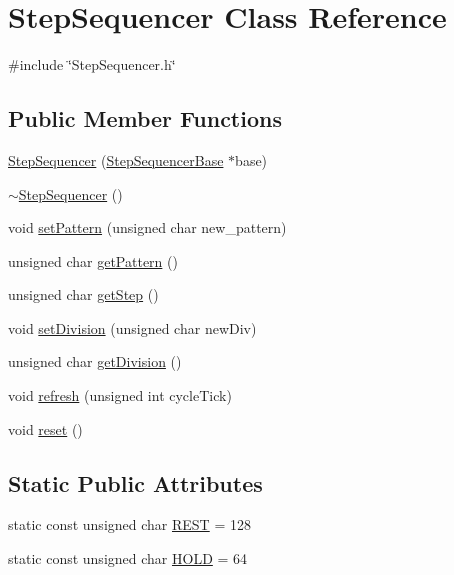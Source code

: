\hypertarget{class_step_sequencer}{}\section{Step\+Sequencer Class Reference}
\label{class_step_sequencer}


{\ttfamily \#include \char`\"{}Step\+Sequencer.\+h\char`\"{}}

\subsection*{Public Member Functions}
\begin{DoxyCompactItemize}
\item 
\hyperlink{class_step_sequencer_a552647854b6f7c5d653432774c357f3e}{Step\+Sequencer} (\hyperlink{class_step_sequencer_base}{Step\+Sequencer\+Base} $\ast$base)
\item 
\hyperlink{class_step_sequencer_a82bc995a1e19baecda84708de8fa265f}{$\sim$\+Step\+Sequencer} ()
\item 
void \hyperlink{class_step_sequencer_ac611afad54d4336977925b7f3495e8b4}{set\+Pattern} (unsigned char new\+\_\+pattern)
\item 
unsigned char \hyperlink{class_step_sequencer_a6c3987d5f4a966e8fcde3f7926aca54e}{get\+Pattern} ()
\item 
unsigned char \hyperlink{class_step_sequencer_ad00472eb91462892049d5e4757e29af3}{get\+Step} ()
\item 
void \hyperlink{class_step_sequencer_a5d62b641961ca9eaef9273efb9ed38b0}{set\+Division} (unsigned char new\+Div)
\item 
unsigned char \hyperlink{class_step_sequencer_a06c5c7b852aee258ad8b245058cee6ad}{get\+Division} ()
\item 
void \hyperlink{class_step_sequencer_a706e6a91c6b3ccd606876f57c334b311}{refresh} (unsigned int cycle\+Tick)
\item 
void \hyperlink{class_step_sequencer_afc3d99a316fa16322c1a582a49e8f272}{reset} ()
\end{DoxyCompactItemize}
\subsection*{Static Public Attributes}
\begin{DoxyCompactItemize}
\item 
static const unsigned char \hyperlink{class_step_sequencer_a2bba012830137ec08afb83cf5da1d799}{R\+E\+ST} = 128
\item 
static const unsigned char \hyperlink{class_step_sequencer_ac1b02d103d79f819639067c5ef5e6803}{H\+O\+LD} = 64
\end{DoxyCompactItemize}


